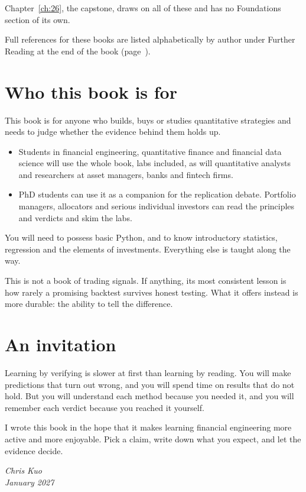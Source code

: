 Chapter~\ref{ch:26}, the capstone, draws on all of these and has no Foundations section of its own.


Full references for these books are listed alphabetically by author under Further Reading at the end of the book (page~\pageref{furtherreading}).


\section*{Who this book is for}

This book is for anyone who builds, buys or studies quantitative strategies and needs to judge whether the evidence behind them holds up.

\begin{itemize}
  \item Students in financial engineering, quantitative finance and financial data science will use the whole book, labs included, as will quantitative analysts and researchers at asset managers, banks and fintech firms.
  \item PhD students can use it as a companion for the replication debate. Portfolio managers, allocators and serious individual investors can read the principles and verdicts and skim the labs.
\end{itemize}

You will need to possess basic Python, and to know introductory statistics, regression and the elements of investments. Everything else is taught along the way.

This is not a book of trading signals. If anything, its most consistent lesson is how rarely a promising backtest survives honest testing. What it offers instead is more durable: the ability to tell the difference.

\section*{An invitation}

Learning by verifying is slower at first than learning by reading. You will make predictions that turn out wrong, and you will spend time on results that do not hold. But you will understand each method because you needed it, and you will remember each verdict because you reached it yourself.

I wrote this book in the hope that it makes learning financial engineering more active and more enjoyable. Pick a claim, write down what you expect, and let the evidence decide.

\bigskip
\begin{flushright}
\emph{Chris Kuo}\\
\emph{January 2027}
\end{flushright}
